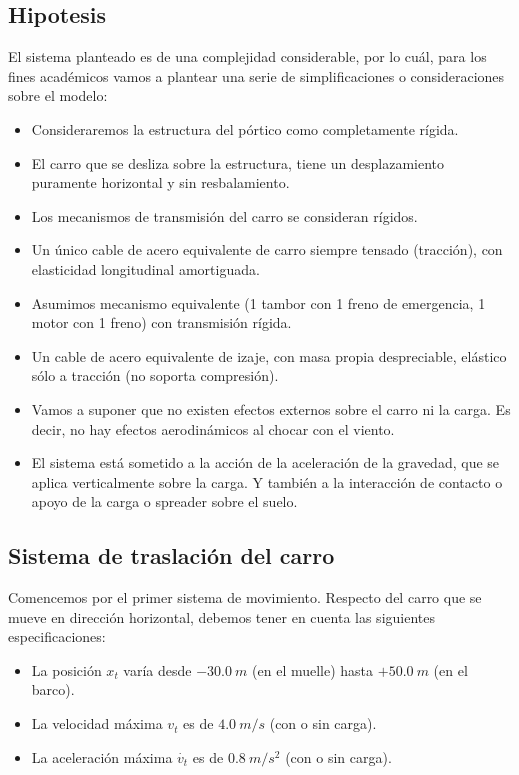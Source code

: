 \documentclass[11pt]{article}
\begin{document}
\subsection{Hipotesis}
El sistema planteado es de una complejidad considerable, por lo cuál, para los fines académicos vamos a plantear una serie de simplificaciones o consideraciones sobre el modelo:
\begin{itemize}
	\item Consideraremos la estructura del pórtico como completamente rígida.
	\item El carro que se desliza sobre la estructura, tiene un desplazamiento puramente horizontal y sin resbalamiento.
	\item Los mecanismos de transmisión del carro se consideran rígidos.
	\item Un único cable de acero equivalente de carro siempre tensado (tracción), con elasticidad longitudinal amortiguada.
	\item Asumimos mecanismo equivalente (1 tambor con 1 freno de emergencia, 1 motor con 1 freno) con transmisión rígida.
	\item Un cable de acero equivalente de izaje, con masa propia despreciable, elástico sólo a tracción (no soporta compresión).
	\item Vamos a suponer que no existen efectos externos sobre el carro ni la carga. Es decir, no hay efectos aerodinámicos al chocar con el viento.
	\item El sistema está sometido a la acción de la aceleración de la gravedad, que se aplica verticalmente sobre la carga. Y también a la interacción de contacto o apoyo de la carga o spreader sobre el suelo.
\end{itemize}

\subsection{Sistema de traslación del carro}
Comencemos por el primer sistema de movimiento. Respecto del carro que se mueve en dirección horizontal, debemos tener en cuenta las siguientes especificaciones:
\begin{itemize}
	\item La posición $x_{t}$ varía desde $-30.0\ m$ (en el muelle) hasta $+50.0\ m$ (en el barco).
	\item La velocidad máxima $v_{t}$ es de $4.0\ m/s$ (con o sin carga).
	\item La aceleración máxima $\dot{v_{t}}$ es de $0.8\ m/s^{2}$ (con o sin carga).
\end{itemize}
\end{document}
